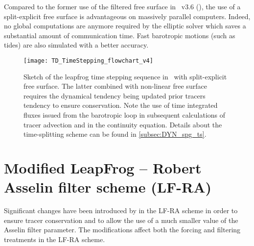 \documentclass[../main/NEMO_manual]{subfiles}
\begin{document}
Compared to the former use of the filtered free surface in \NEMO\ v3.6 (\citet{roullet.madec_JGR00}),
the use of a split-explicit free surface is advantageous on massively parallel computers.
Indeed, no global computations are anymore required by the elliptic solver which
saves a substantial amount of communication time.
Fast barotropic motions (such as tides) are also simulated with a better accuracy.

\begin{figure}
  \centering
  \texttt{[image: TD\_TimeStepping\_flowchart\_v4]}
  \caption[Leapfrog time stepping sequence with split-explicit free surface]{
    Sketch of the leapfrog time stepping sequence in \NEMO\ with split-explicit free surface.
    The latter combined with non-linear free surface requires
    the dynamical tendency being updated prior tracers tendency to ensure conservation.
    Note the use of time integrated fluxes issued from the barotropic loop in
    subsequent calculations of tracer advection and in the continuity equation.
    Details about the time-splitting scheme can be found in \autoref{subsec:DYN_spg_ts}.}
  \label{fig:TD_TimeStep_flowchart}
\end{figure}

\section{Modified LeapFrog -- Robert Asselin filter scheme (LF-RA)}
\label{sec:TD_mLF}

Significant changes have been introduced by \cite{leclair.madec_OM09} in
the LF-RA scheme in order to ensure tracer conservation and to
allow the use of a much smaller value of the Asselin filter parameter.
The modifications affect both the forcing and filtering treatments in the LF-RA scheme.
\end{document}
